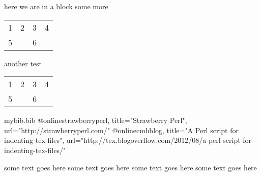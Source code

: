 


here we are in a block
some more
\begin{tabular}{cccc}
			1 & 2 & 3 & 4 \\
			5 &   & 6 &   \\
\end{tabular}

another test
\begin{tabular}{cccc}
			1 & 2 & 3 & 4 \\
			5 &   & 6 &   \\
\end{tabular}

\begin{filecontents}{mybib.bib}
	@online{strawberryperl,
					title="Strawberry Perl",
					url="http://strawberryperl.com/"}
	@online{cmhblog,
					title="A Perl script for indenting tex files",
					url="http://tex.blogoverflow.com/2012/08/a-perl-script-for-indenting-tex-files/"}
\end{filecontents}

\begin{myotherenvironment}
	some text goes here
	some text goes here
	some text goes here
	some text goes here
\end{myotherenvironment}

